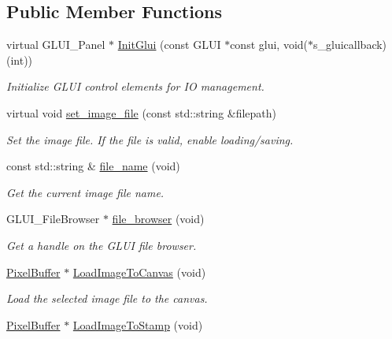 \subsection*{Public Member Functions}
\begin{DoxyCompactItemize}
\item 
virtual G\+L\+U\+I\+\_\+\+Panel $\ast$ \hyperlink{classimage__tools_1_1IOManager_a5ca6552ef9e8bd987ffba7a6b93884d0}{Init\+Glui} (const G\+L\+UI $\ast$const glui, void($\ast$s\+\_\+gluicallback)(int))
\begin{DoxyCompactList}\small\item\em Initialize G\+L\+UI control elements for IO management. \end{DoxyCompactList}\item 
virtual void \hyperlink{classimage__tools_1_1IOManager_a9ddac98843256d25442aba6c963e144a}{set\+\_\+image\+\_\+file} (const std\+::string \&filepath)
\begin{DoxyCompactList}\small\item\em Set the image file. If the file is valid, enable loading/saving. \end{DoxyCompactList}\item 
const std\+::string \& \hyperlink{classimage__tools_1_1IOManager_a667da573afc3fc0977408a0bf669f448}{file\+\_\+name} (void)
\begin{DoxyCompactList}\small\item\em Get the current image file name. \end{DoxyCompactList}\item 
G\+L\+U\+I\+\_\+\+File\+Browser $\ast$ \hyperlink{classimage__tools_1_1IOManager_ab58911faeeb831cc1f62aec390718469}{file\+\_\+browser} (void)
\begin{DoxyCompactList}\small\item\em Get a handle on the G\+L\+UI file browser. \end{DoxyCompactList}\item 
\hyperlink{classimage__tools_1_1PixelBuffer}{Pixel\+Buffer} $\ast$ \hyperlink{classimage__tools_1_1IOManager_ad4ff65611983d52fdd8044d1f872470d}{Load\+Image\+To\+Canvas} (void)\hypertarget{classimage__tools_1_1IOManager_ad4ff65611983d52fdd8044d1f872470d}{}\label{classimage__tools_1_1IOManager_ad4ff65611983d52fdd8044d1f872470d}

\begin{DoxyCompactList}\small\item\em Load the selected image file to the canvas. \end{DoxyCompactList}\item 
\hyperlink{classimage__tools_1_1PixelBuffer}{Pixel\+Buffer} $\ast$ \hyperlink{classimage__tools_1_1IOManager_aa0073a9dc04be9ae961ee5d3b70116f1}{Load\+Image\+To\+Stamp} (void)\hypertarget{classimage__tools_1_1IOManager_aa0073a9dc04be9ae961ee5d3b70116f1}{}\label{classimage__tools_1_1IOManager_aa0073a9dc04be9ae961ee5d3b70116f1}


\end{DoxyCompactItemize}
